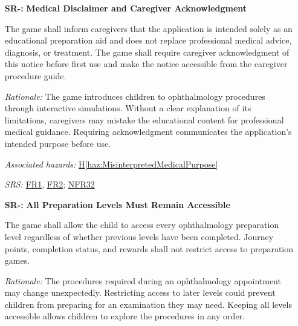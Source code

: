 \documentclass{article}
\newcounter{hazard}
\newcommand{\hazref}[1]{\hyperref[haz:#1]{H\ref*{haz:#1}}}
\newcounter{sr}
\newcommand{\srdef}[1]{\refstepcounter{sr}\label{sr:#1}\textbf{SR-\thesr:}}
\newcommand{\srsurl}{https://team-hindsight.github.io/ophthamology-game/SRS-IEEE/SRS.pdf}
\newcommand{\srsfrref}[2]{\href{\srsurl\#nameddest=#1}{FR#2}}
\newcommand{\srsnfrref}[2]{\href{\srsurl\#nameddest=#1}{NFR#2}}
\begin{document}
\begin{itemize}[leftmargin=1.5cm, labelwidth=1.3cm, labelsep=0.2cm,
  align=left, itemsep=1.2em, parsep=0.6em]
All images, sounds, language and story in the game shall be reviewed by a
child-life specialist or child development expert before release, confirming
that they are suitable for children aged three to seven, contain no
frightening material, and make no promise that a procedure will not be
uncomfortable.

\textit{Rationale:} Child-life experts judge emotional suitability, which the
clinical review does not cover. This matters more in a game, where story and
excitement are added to the medical content.

\textit{Associated hazards:} \hazref{SensationsHidden}, \hazref{Frightening}

\textit{SRS:} \srsnfrref{NFR_ChildSafe}{2}, \srsnfrref{NFR_Language}{8}

\item[\srdef{MedicalDisclaimer}]
\textbf{Medical Disclaimer and Caregiver Acknowledgment}

The game shall inform caregivers that the
application is intended solely as an educational
preparation aid and does not replace professional
medical advice, diagnosis, or treatment.
The game shall require caregiver acknowledgment
of this notice before first use and make the
notice accessible from the caregiver procedure guide.

\textit{Rationale:}
The game introduces children to ophthalmology
procedures through interactive simulations.
Without a clear explanation of its limitations,
caregivers may mistake the educational content
for professional medical guidance. Requiring
acknowledgment communicates the application's
intended purpose before use.

\textit{Associated hazards:}
\hazref{MisinterpretedMedicalPurpose}

\textit{SRS:} \srsfrref{FR_MedicalNotice}{1}, \srsfrref{FR_RecordAck}{2}; \srsnfrref{NFR_NoClaims}{32}

\item[\srdef{AllLevelsAccessible}]
\textbf{All Preparation Levels Must Remain Accessible}

The game shall allow the child to access every
ophthalmology preparation level regardless of
whether previous levels have been completed.
Journey points, completion status, and rewards
shall not restrict access to preparation games.

\textit{Rationale:}
The procedures required during an ophthalmology
appointment may change unexpectedly. Restricting
access to later levels could prevent children from
preparing for an examination they may need.
Keeping all levels accessible allows children
to explore the procedures in any order.


\end{itemize}
\end{document}
